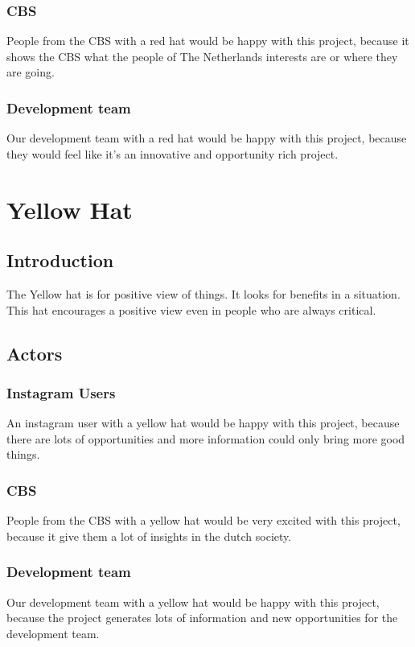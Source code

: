 \documentclass{article}
\begin{document}
        \subsubsection{CBS}
            People from the CBS with a red hat would be happy with this project, because it shows the CBS what the people of The Netherlands interests are or where they are going.
        
        \subsubsection{Development team}
            Our development team with a red hat would be happy with this project, because they would feel like it's an innovative and opportunity rich project.

\pagebreak

\section{Yellow Hat}
    \subsection{Introduction}
        The Yellow hat is for positive view of things. It looks for benefits in a situation. This hat encourages a positive view even in people who are always critical.

    \subsection{Actors}
        \subsubsection{Instagram Users}
            An instagram user with a yellow hat would be happy with this project, because there are lots of opportunities and more information could only bring more good things. 
        
        \subsubsection{CBS}
            People from the CBS with a yellow hat would be very excited with this project, because it give them a lot of insights in the dutch society.
        
        \subsubsection{Development team}
            Our development team with a yellow hat would be happy with this project, because the project generates lots of information and new opportunities for the development team.
\end{document}
